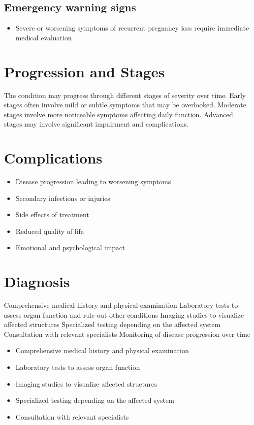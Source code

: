\subsection{Emergency warning signs}
\begin{itemize}[noitemsep]
  \item Severe or worsening symptoms of recurrent pregnancy loss require immediate medical evaluation
\end{itemize}
\section{Progression and Stages}
The condition may progress through different stages of severity over time. Early stages often involve mild or subtle symptoms that may be overlooked. Moderate stages involve more noticeable symptoms affecting daily function. Advanced stages may involve significant impairment and complications.
\section{Complications}
\begin{itemize}[noitemsep]
  \item Disease progression leading to worsening symptoms
  \item Secondary infections or injuries
  \item Side effects of treatment
  \item Reduced quality of life
  \item Emotional and psychological impact
\end{itemize}
\section{Diagnosis}
Comprehensive medical history and physical examination Laboratory tests to assess organ function and rule out other conditions Imaging studies to visualize affected structures Specialized testing depending on the affected system Consultation with relevant specialists Monitoring of disease progression over time

\begin{itemize}[noitemsep]
  \item Comprehensive medical history and physical examination
  \item Laboratory tests to assess organ function
  \item Imaging studies to visualize affected structures
  \item Specialized testing depending on the affected system
  \item Consultation with relevant specialists
\end{itemize}
